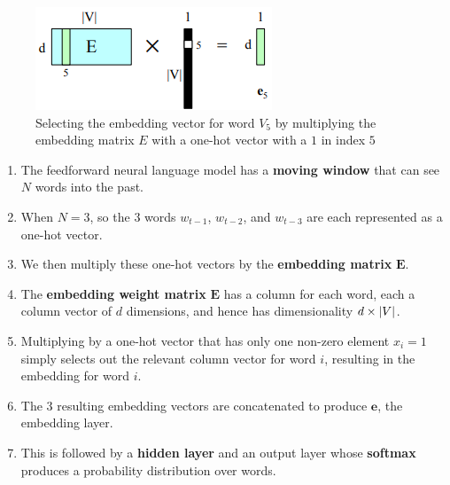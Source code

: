 \begin{table}[H]
    \begin{minipage}{0.45\linewidth}
        \begin{figure}[H]
            \includegraphics[width=\linewidth]{Pictures/nlp/fig-7-16.png}
            \caption{Selecting the embedding vector for word $V_5$ by multiplying the embedding matrix $E$ with a one-hot vector with a $1$ in index $5$}
        \end{figure}
    \end{minipage}
    \hfill
    \begin{minipage}{0.65\linewidth}
        \begin{enumerate}
            \item The feedforward neural language model has a \textbf{moving window} that can see $N$ words into the past.

            \item When $N=3$, so the $3$ words $w_{t-1}$, $w_{t-2}$, and $w_{t-3}$ are each represented as a one-hot vector.

            \item We then multiply these one-hot vectors by the \textbf{embedding matrix}  $\mathbf{E}$.

            \item The \textbf{embedding weight matrix} $\mathbf{E}$ has a column for each word, each a column vector of $d$ dimensions, and hence has dimensionality $d \times \left| V \right|$. 
            
            \item Multiplying by a one-hot vector that has only one non-zero element $x_i = 1$ simply selects out the relevant column vector for word $i$, resulting in the embedding for word $i$.

            \item The 3 resulting embedding vectors are concatenated to produce $\mathbf{e}$, the embedding layer. 
            
            \item This is followed by a \textbf{hidden layer} and an output layer whose \textbf{softmax} produces a probability distribution over words.
        \end{enumerate}
    \end{minipage}
\end{table}
